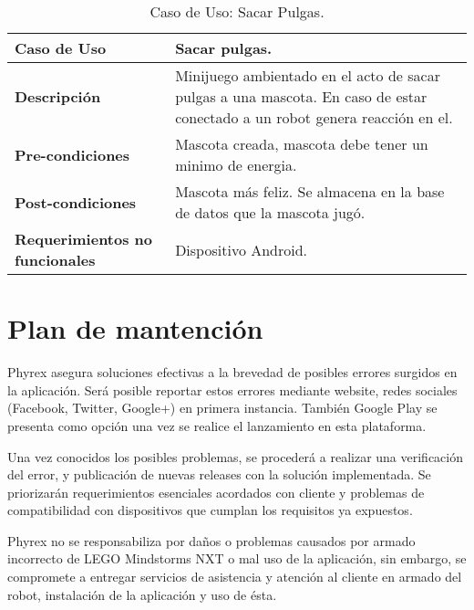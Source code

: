 \begin{table}[htbp!]
  \centering
  \begin{tabular}{|p{4cm}|p{6cm}|}\hline
    \bf{Caso de Uso}                   & Sacar pulgas. \\ \hline
    \bf{Descripci\'on}                 & Minijuego ambientado en el acto de sacar pulgas a una mascota. En caso de estar conectado a un robot genera reacci\'on en el. \\ \hline
    \bf{Pre-condiciones}               & Mascota creada, mascota debe tener un minimo de energia. \\ \hline
    \bf{Post-condiciones}              & Mascota m\'as feliz. Se almacena en la base de datos que la mascota jug\'o. \\ \hline
    \bf{Requerimientos no funcionales} & Dispositivo Android.  \\ \hline
  \end{tabular}
  \caption[~~Caso de Uso: Sacar Pulgas]{Caso de Uso: Sacar Pulgas.}
  \label{table:SacarPulgas}
\end{table}

\newpage
%
%
\section{Plan de mantenci\'on}
Phyrex asegura soluciones efectivas a la brevedad de posibles errores surgidos en la aplicaci\'on. Ser\'a posible reportar estos errores mediante website, redes sociales (Facebook, Twitter, Google+) en primera instancia. Tambi\'en Google Play se presenta como opci\'on una vez se realice el lanzamiento en esta plataforma.

Una vez conocidos los posibles problemas, se proceder\'a a realizar una verificaci\'on del error, y publicaci\'on de nuevas releases con la soluci\'on implementada. Se priorizar\'an requerimientos esenciales acordados con cliente y problemas de compatibilidad con dispositivos que cumplan los requisitos ya expuestos.

Phyrex no se responsabiliza por da\~nos o problemas causados por armado incorrecto de LEGO Mindstorms NXT o mal uso de la aplicaci\'on, sin embargo, se compromete a entregar servicios de asistencia y atenci\'on al cliente en armado del robot, instalaci\'on de la aplicaci\'on y uso de \'esta.

\newpage
